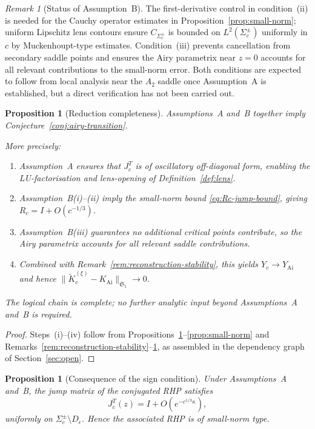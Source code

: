\documentclass[12pt,a4paper]{amsart}
\newtheorem{proposition}[theorem]{Proposition}
\theoremstyle{definition}
\theoremstyle{remark}
\newtheorem{remark}[theorem]{Remark}
\begin{document}
\begin{remark}[Status of Assumption~B]
\label{rem:g-open}
The first-derivative control in condition~(ii) is needed for the
Cauchy operator estimates in Proposition~\ref{prop:small-norm};
uniform Lipschitz lens contours ensure $C_{\Sigma_c^\pm}$ is bounded
on $L^2(\Sigma_c^\pm)$ uniformly in $c$ by Muckenhoupt-type estimates.
Condition~(iii) prevents cancellation from secondary saddle points
and ensures the Airy parametrix near $z=0$ accounts for all relevant
contributions to the small-norm error.
Both conditions are expected to follow from local analysis near the
$A_2$ saddle once Assumption~A is established, but a direct
verification has not been carried out.
\end{remark}

\begin{proposition}[Reduction completeness]
\label{prop:reduction-completeness}
Assumptions~A and~B together imply
Conjecture~\ref{conj:airy-transition}.

More precisely:
\begin{enumerate}[label=(\roman*)]
\item Assumption~A ensures that $J_c^T$ is of oscillatory
  off-diagonal form, enabling the LU-factorisation and lens-opening
  of Definition~\ref{def:lens}.
\item Assumption~B(i)--(ii) imply the small-norm bound
  \eqref{eq:Rc-jump-bound}, giving $R_c = I + O(c^{-1/3})$.
\item Assumption~B(iii) guarantees no additional critical points
  contribute, so the Airy parametrix accounts for all relevant
  saddle contributions.
\item Combined with Remark~\ref{rem:reconstruction-stability},
  this yields $Y_c \to Y_{\mathrm{Ai}}$ and hence
  $\|\widetilde{K}_c^{(\xi)} - K_{\mathrm{Ai}}\|_{\mathfrak{S}_1} \to 0$.
\end{enumerate}
The logical chain is complete; no further analytic input beyond
Assumptions~A and~B is required.
\end{proposition}

\begin{proof}
Steps~(i)--(iv) follow from
Propositions~\ref{prop:g-implies-small-norm}--\ref{prop:small-norm}
and Remarks~\ref{rem:reconstruction-stability}--\ref{rem:g-open},
as assembled in the dependency graph of Section~\ref{sec:open}.
\end{proof}

\begin{proposition}[Consequence of the sign condition]
\label{prop:g-implies-small-norm}
Under Assumptions~A and~B, the jump matrix of the conjugated
RHP satisfies
\[
  J_c^T(z) = I + O(e^{-c^{1/3}\kappa}),
\]
uniformly on $\Sigma_c^\pm \setminus D_\epsilon$.
Hence the associated RHP is of small-norm type.
\end{proposition}
\end{document}
